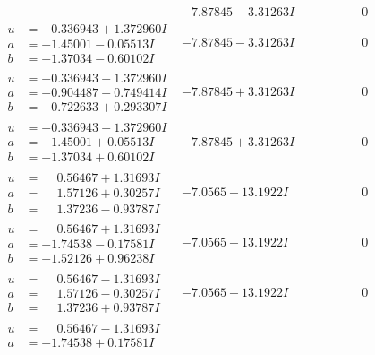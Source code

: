 \documentclass[1p]{elsarticle_modified}
\theoremstyle{definition}
\begin{document}
$$\begin{array}{c|c|c}
 & -7.87845 - 3.31263 I & \phantom{-0.000000 } 0 \\ \hline\begin{aligned}
u &= -0.336943 + 1.372960 I \\
a &= -1.45001 - 0.05513 I \\
b &= -1.37034 - 0.60102 I\end{aligned}
 & -7.87845 - 3.31263 I & \phantom{-0.000000 } 0 \\ \hline\begin{aligned}
u &= -0.336943 - 1.372960 I \\
a &= -0.904487 - 0.749414 I \\
b &= -0.722633 + 0.293307 I\end{aligned}
 & -7.87845 + 3.31263 I & \phantom{-0.000000 } 0 \\ \hline\begin{aligned}
u &= -0.336943 - 1.372960 I \\
a &= -1.45001 + 0.05513 I \\
b &= -1.37034 + 0.60102 I\end{aligned}
 & -7.87845 + 3.31263 I & \phantom{-0.000000 } 0 \\ \hline\begin{aligned}
u &= \phantom{-}0.56467 + 1.31693 I \\
a &= \phantom{-}1.57126 + 0.30257 I \\
b &= \phantom{-}1.37236 - 0.93787 I\end{aligned}
 & -7.0565 + 13.1922 I & \phantom{-0.000000 } 0 \\ \hline\begin{aligned}
u &= \phantom{-}0.56467 + 1.31693 I \\
a &= -1.74538 - 0.17581 I \\
b &= -1.52126 + 0.96238 I\end{aligned}
 & -7.0565 + 13.1922 I & \phantom{-0.000000 } 0 \\ \hline\begin{aligned}
u &= \phantom{-}0.56467 - 1.31693 I \\
a &= \phantom{-}1.57126 - 0.30257 I \\
b &= \phantom{-}1.37236 + 0.93787 I\end{aligned}
 & -7.0565 - 13.1922 I & \phantom{-0.000000 } 0 \\ \hline\begin{aligned}
u &= \phantom{-}0.56467 - 1.31693 I \\
a &= -1.74538 + 0.17581 I \\

\end{aligned}
\end{array}$$
\end{document}
